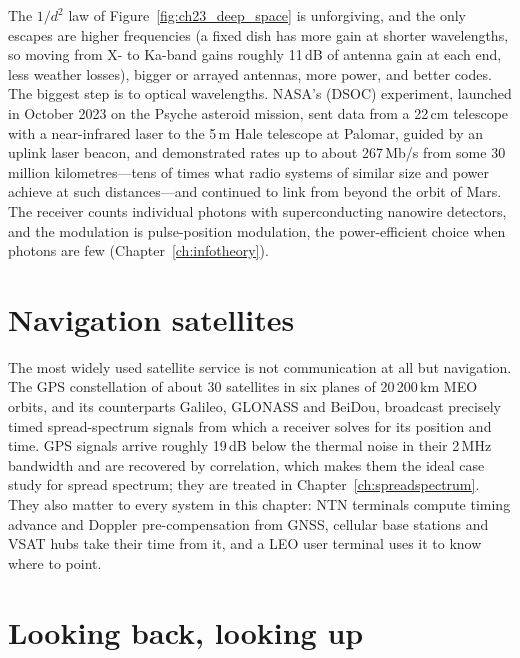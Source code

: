 The $1/d^2$ law of Figure~\ref{fig:ch23_deep_space} is unforgiving, and the only escapes are
higher frequencies (a fixed dish has more gain at shorter wavelengths, so moving from X- to Ka-band
gains roughly 11\,dB of antenna gain at each end, less weather losses), bigger or arrayed antennas,
more power, and better codes. The biggest step is to optical wavelengths. NASA's  (DSOC) experiment, launched in October 2023 on the Psyche asteroid mission,
sent data from a 22\,cm telescope with a near-infrared laser to the 5\,m Hale telescope at Palomar,
guided by an uplink laser beacon, and demonstrated rates up to about 267\,Mb/s from some 30 million
kilometres---tens of times what radio systems of similar size and power achieve at such
distances---and continued to link from beyond the orbit of Mars. The receiver counts individual
photons with superconducting nanowire detectors, and the modulation is pulse-position
modulation, the power-efficient choice when photons are few (Chapter~\ref{ch:infotheory}).


\section{Navigation satellites}

The most widely used satellite service is not communication at all but navigation. The GPS
constellation of about 30 satellites in six planes of 20\,200\,km MEO orbits, and its
counterparts Galileo, GLONASS and BeiDou, broadcast precisely timed spread-spectrum signals from
which a receiver solves for its position and time. GPS signals arrive roughly 19\,dB below the
thermal noise in their 2\,MHz bandwidth and are recovered by correlation, which makes them the ideal
case study for spread spectrum; they are treated in Chapter~\ref{ch:spreadspectrum}. They also
matter to every system in this chapter: NTN terminals compute timing advance and Doppler
pre-compensation from GNSS, cellular base stations and VSAT hubs take their time from it, and a
LEO user terminal uses it to know where to point.

\section{Looking back, looking up}

